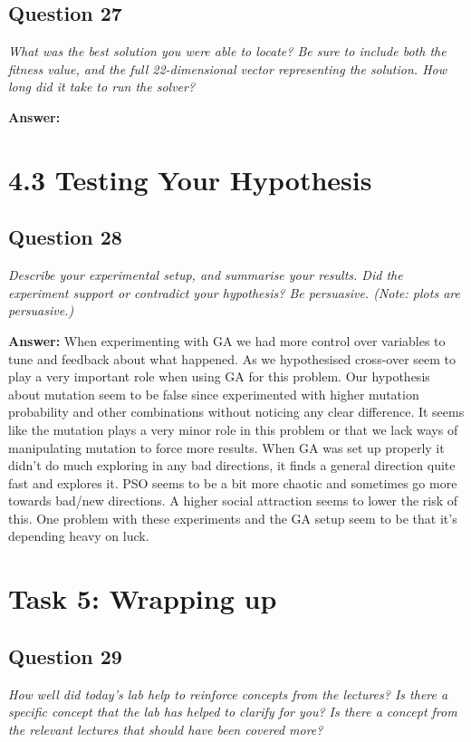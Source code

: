 \documentclass[a4paper]{article}
\begin{document}
\subsection*{Question 27}
\emph{What was the best solution you were able to locate? Be sure to
include both the fitness value, and the full 22-dimensional vector representing the solution. How long did it take to run the solver?}

\textbf{Answer:}

\section*{4.3 Testing Your Hypothesis}

\subsection*{Question 28}
\emph{Describe your experimental setup, and summarise your results.
Did the experiment support or contradict your hypothesis? Be persuasive. (Note: plots are persuasive.)}

\textbf{Answer:} When experimenting with GA we had more control over variables to tune and feedback about what happened. As we hypothesised cross-over seem to play a very important role when using GA for this problem. 
Our hypothesis about mutation seem to be false since experimented with higher mutation probability and other combinations without noticing any clear difference. It seems like the mutation plays a very minor role in this problem or that we lack ways of manipulating mutation to force more results. 
When GA was set up properly it didn't do much exploring in any bad directions, it finds a general direction quite fast and explores it. PSO seems to be a bit more chaotic and sometimes go more towards bad/new directions. A higher social attraction seems to lower the risk of this. 
One problem with these experiments and the GA setup seem to be that it's depending heavy on luck. 

\section*{Task 5: Wrapping up}

\subsection*{Question 29}
\emph{How well did today's lab help to reinforce concepts from the
lectures? Is there a specific concept that the lab has helped to clarify for you? Is there a concept from the relevant lectures that should have been covered more?}
\end{document}
